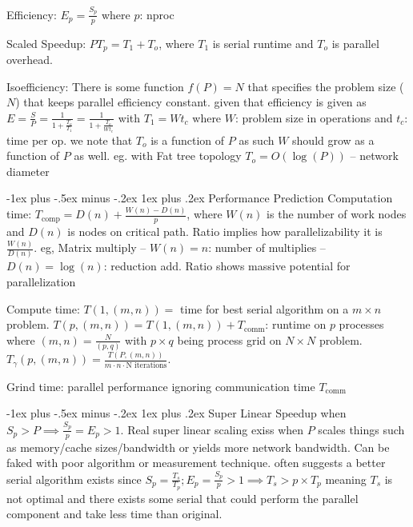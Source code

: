 \documentclass[letter,8pt,landscape]{article}
\makeatletter
\renewcommand{\subsubsection}{\@startsection{subsubsection}{3}{0mm}%
                                {-1ex plus -.5ex minus -.2ex}%
                                {1ex plus .2ex}%
                                {\normalfont\small\bfseries}}
\makeatother
\begin{document}
\begin{multicols}{3}
  Efficiency: $E_p = \frac{S_p}{p}$ where $p$: nproc


  Scaled Speedup: $PT_p = T_1 + T_o$, where $T_1$ is serial runtime and $T_o$ is
  parallel overhead.

  Isoefficiency: There is some function $f(P) = N$ that specifies the problem
  size ($N$) that keeps parallel efficiency constant. given that efficiency is
  given as $E = \frac{S}{P} = \frac{1}{1 + \frac{T_o}{T_1}} = \frac{1}{1 +
  \frac{T_o}{Wt_c}} $ with $T_1 = Wt_c$ where $W$: problem size in operations
  and $t_c$: time per op. we note that $T_o$ is a function of $P$ as such $W$
  should grow as a function of $P$ as well. eg. with Fat tree topology $T_o =
  O(\log(P))$ -- network diameter

  \subsubsection{Performance Prediction}
  Computation time: $T_\text{comp} = D(n) + \frac{W(n) - D(n)}{p}$, where $W(n)$
  is the number of work nodes and $D(n)$ is nodes on critical path. Ratio
  implies how parallelizability it is $\frac{W(n)}{D(n)}$. eg, Matrix multiply
  -- $W(n) = n$: number of multiplies -- $D(n) = \log(n)$: reduction add. Ratio
  shows massive potential for parallelization

  Compute time: $T(1, (m,n)) =$ time for best serial algorithm on a $m\times n$
  problem. $T(p, (m,n)) = T(1,(m,n)) + T_\text{comm}$: runtime on $p$ processes
  where $(m,n) = \frac{N}{(p,q)}$ with $p\times q$ being process grid on
  $N\times N$ problem.
  $T_\gamma(p, (m,n)) = \frac{T(P,(m,n))}{m\cdot n\cdot \text{N iterations}}$.
  
  Grind time: parallel performance ignoring communication time
  $T_\text{comm}$



  \subsubsection{Super Linear Speedup}
  when $S_p > P \implies \frac{S_p}{p} = E_p > 1$. Real super linear scaling
  exiss when $P$ scales things such as memory/cache sizes/bandwidth or yields
  more network bandwidth. Can be faked with poor algorithm or measurement
  technique. often suggests a better serial algorithm exists since $S_p =
  \frac{T_s}{T_p}; E_p = \frac{S_p}{p} > 1 \implies T_s > p\times T_p$ meaning
  $T_s$ is not optimal and there exists some serial that could perform the
  parallel component and take less time than original.



\end{multicols}
\end{document}
